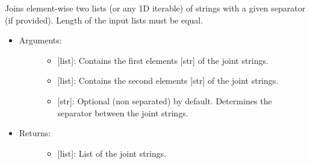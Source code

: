 \documentclass[letterpaper,10pt,english]{sphinxmanual}
\begin{document}

\begin{fulllineitems}
\label{\detokenize{strings:data_tools.strings.join_str_lists}}
Joins element-wise two lists (or any 1D iterable) of strings with a
given separator (if provided). Length of the input lists must be
equal.
\begin{itemize}
\item {} \begin{description}
\item[{Arguments:}] \leavevmode\begin{itemize}
\item {} 
 {[}list{]}: Contains the first elements {[}str{]} of the joint
strings.

\item {} 
 {[}list{]}: Contains the second elements {[}str{]} of the joint
strings.

\item {} 
 {[}str{]}: Optional  (non separated) by default.
Determines the separator between the joint strings.

\end{itemize}

\end{description}

\item {} \begin{description}
\item[{Returns:}] \leavevmode\begin{itemize}
\item {} 
{[}list{]}: List of the joint strings.

\end{itemize}

\end{description}


\end{itemize}
\end{fulllineitems}
\end{document}
